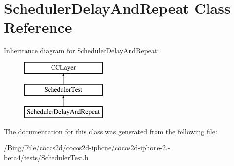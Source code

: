 \hypertarget{interface_scheduler_delay_and_repeat}{\section{Scheduler\-Delay\-And\-Repeat Class Reference}
\label{interface_scheduler_delay_and_repeat}
}
Inheritance diagram for Scheduler\-Delay\-And\-Repeat\-:\begin{figure}[H]
\begin{center}
\leavevmode
\includegraphics[height=3.000000cm]{interface_scheduler_delay_and_repeat}
\end{center}
\end{figure}


The documentation for this class was generated from the following file\-:\begin{DoxyCompactItemize}
\item 
/\-Bing/\-File/cocos2d/cocos2d-\/iphone/cocos2d-\/iphone-\/2.-\/beta4/tests/Scheduler\-Test.\-h\end{DoxyCompactItemize}
